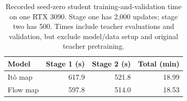 \begin{table}[t]
\caption{Recorded seed-zero student training-and-validation time on one RTX 3090. Stage one has 2,000 updates; stage two has 500. Times include teacher evaluations and validation, but exclude model/data setup and original teacher pretraining.}
\label{tab:training-cost}
\centering
\begin{tabular}{lrrr}
\toprule
Model & Stage 1 (s) & Stage 2 (s) & Total (min) \\
\midrule
It\^o map & 617.9 & 521.8 & 18.99 \\
Flow map & 597.8 & 514.0 & 18.53 \\
\bottomrule
\end{tabular}
\end{table}
